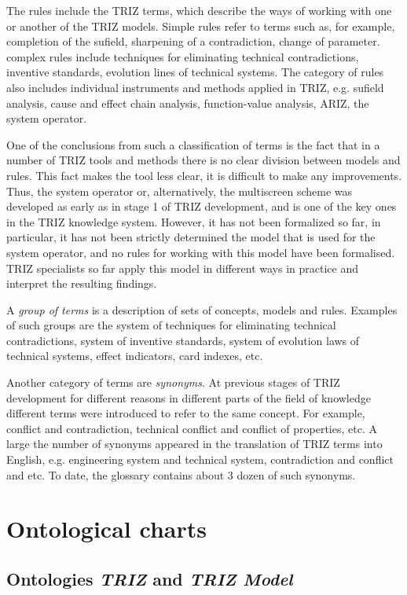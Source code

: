 \documentclass[11pt,a4paper]{article}
\begin{document}
The rules include the TRIZ terms, which describe the ways of working with one
or another of the TRIZ models. Simple rules refer to terms such as, for
example, completion of the sufield, sharpening of a contradiction, change of
parameter. complex rules include techniques for eliminating technical
contradictions, inventive standards, evolution lines of technical systems.
The category of rules also includes individual instruments and methods applied
in TRIZ, e.g. sufield analysis, cause and effect chain analysis,
function-value analysis, ARIZ, the system operator.

One of the conclusions from such a classification of terms is the fact that in
a number of TRIZ tools and methods there is no clear division between models
and rules. This fact makes the tool less clear, it is difficult to make any
improvements. Thus, the system operator or, alternatively, the multiscreen
scheme was developed as early as in stage 1 of TRIZ development, and is one of
the key ones in the TRIZ knowledge system.  However, it has not been
formalized so far, in particular, it has not been strictly determined the
model that is used for the system operator, and no rules for working with this
model have been formalised. TRIZ specialists so far apply this model in
different ways in practice and interpret the resulting findings. 

A \emph{group of terms} is a description of sets of concepts, models and
rules.  Examples of such groups are the system of techniques for eliminating
technical contradictions, system of inventive standards, system of evolution
laws of technical systems, effect indicators, card indexes, etc.

Another category of terms are \emph{synonyms}. At previous stages of TRIZ
development for different reasons in different parts of the field of knowledge
different terms were introduced to refer to the same concept. For example,
conflict and contradiction, technical conflict and conflict of properties,
etc. A large the number of synonyms appeared in the translation of TRIZ terms
into English, e.g. engineering system and technical system, contradiction and
conflict and etc.  To date, the glossary contains about 3 dozen of such
synonyms.

\section{Ontological charts}

\subsection{Ontologies \emph{TRIZ} and \emph{TRIZ Model}}
\end{document}
